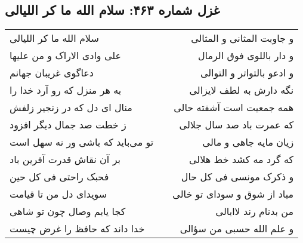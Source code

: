\begin{center}
\section*{غزل شماره ۴۶۳: سلام الله ما کر اللیالی}
\label{sec:sh463}
\begin{longtable}{l p{0.5cm} r}
سلام الله ما کر اللیالی
&&
و جاوبت المثانی و المثالی
\\
علی وادی الاراک و من علیها
&&
و دار باللوی فوق الرمال
\\
دعاگوی غریبان جهانم
&&
و ادعو بالتواتر و التوالی
\\
به هر منزل که رو آرد خدا را
&&
نگه دارش به لطف لایزالی
\\
منال ای دل که در زنجیر زلفش
&&
همه جمعیت است آشفته حالی
\\
ز خطت صد جمال دیگر افزود
&&
که عمرت باد صد سال جلالی
\\
تو می‌باید که باشی ور نه سهل است
&&
زیان مایه جاهی و مالی
\\
بر آن نقاش قدرت آفرین باد
&&
که گرد مه کشد خط هلالی
\\
فحبک راحتی فی کل حین
&&
و ذکرک مونسی فی کل حال
\\
سویدای دل من تا قیامت
&&
مباد از شوق و سودای تو خالی
\\
کجا یابم وصال چون تو شاهی
&&
من بدنام رند لاابالی
\\
خدا داند که حافظ را غرض چیست
&&
و علم الله حسبی من سؤالی
\\
\end{longtable}
\end{center}
